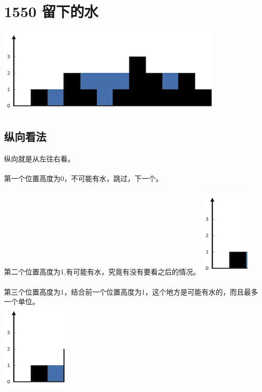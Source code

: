 \documentclass[UTF-8, 12pt]{ctexart}
\begin{document}
\section{1550 留下的水}
    \includegraphics[width = .8\textwidth]{Water.png}
    \subsection{纵向看法}
    \paragraph{}
    纵向就是从左往右看。
    \paragraph{}
    第一个位置高度为0，不可能有水，跳过，下一个。
    \paragraph{}
    第二个位置高度为1,有可能有水，究竟有没有要看之后的情况。
    \includegraphics[width = .2\textwidth]{Water_1.png}
    \paragraph{}
    第三个位置高度为1，结合前一个位置高度为1，这个地方是可能有水的，而且最多一个单位。\\
    \includegraphics[width = .2\textwidth]{Water_2.png}
\end{document}
